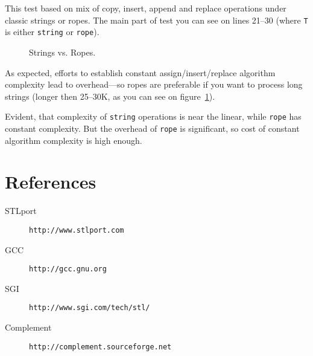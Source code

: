 \documentclass[a4paper]{article}
\begin{document}
This test based on mix of copy, insert, append and replace
operations under classic strings or ropes. The main part
of test you can see on lines 21--30 (where \texttt{T} is
either \texttt{string} or \texttt{rope}).



\begin{figure}
  \begin{center}
    
  \end{center}
  \caption{Strings vs. Ropes.\label{STLport-rope-string}}
\end{figure}

As expected, efforts to establish constant assign/insert/replace
algorithm complexity lead to
overhead---so ropes are preferable if you want to process
long strings (longer then 25--30K, as you can see on figure~\ref{STLport-rope-string}).

Evident, that complexity of \texttt{string} operations is near the linear,
while \texttt{rope} has constant complexity. But the overhead
of \texttt{rope} is significant, so cost of constant algorithm complexity
is high enough.

\section{References}

\noindent
\begin{description}
  \item[STLport] \texttt{http://www.stlport.com}
  \item[GCC]     \texttt{http://gcc.gnu.org}
  \item[SGI]     \texttt{http://www.sgi.com/tech/stl/}
  \item[Complement] \texttt{http://complement.sourceforge.net}
\end{description}
\end{document}
